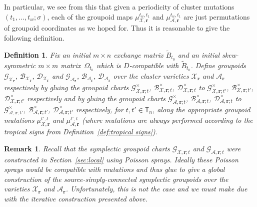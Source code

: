 \documentclass{amsart}
\newtheorem{definition}[theorem]{Definition}
\newtheorem{remark}[theorem]{Remark}
\numberwithin{equation}{section}
\newcommand{\bfr}{{\boldsymbol{r}}}
\newcommand{\cA}{\mathcal{A}}
\newcommand{\cB}{\mathcal{B}}
\newcommand{\cD}{\mathcal{D}}
\newcommand{\cG}{\mathcal{G}}
\newcommand{\cX}{\mathcal{X}}
\newcommand{\TT}{\mathbb{T}}
\begin{document}
In particular, we see from this that given a periodicity of cluster mutations $(t_1,\ldots,t_w;\sigma)$, each of the groupoid maps $\mu_{\cX,\bfr}^{t_w,t_1}$ and $\mu_{\cA,\bfr}^{t_w,t_1}$ are just permutations of groupoid coordinates as we hoped for.
Thus it is reasonable to give the following definition.
\begin{definition}
  Fix an initial $m\times n$ exchange matrix $\tilde B_{t_0}$ and an initial skew-symmetric $m\times m$ matrix~$\Omega_{t_0}$ which is $D$-compatible with $\tilde B_{t_0}$.
  Define groupoids $\cG_{\cX_\bfr}$, $\cB_{\cX_\bfr}$, $\cD_{\cX_\bfr}$ and $\cG_{\cA_\bfr}$, $\cB_{\cA_\bfr}$, $\cD_{\cA_\bfr}$ over the cluster varieties $\cX_\bfr$ and $\cA_\bfr$ respectively by gluing the groupoid charts $\cG^\times_{\cX,\bfr;t}$, $\cB^\times_{\cX,\bfr;t}$, $\cD^\times_{\cX,\bfr;t}$ to $\cG^\times_{\cX,\bfr;t'}$, $\cB^\times_{\cX,\bfr;t'}$, $\cD^\times_{\cX,\bfr;t'}$ respectively and by gluing the groupoid charts $\cG^\times_{\cA,\bfr;t}$, $\cB^\times_{\cA,\bfr;t}$, $\cD^\times_{\cA,\bfr;t}$ to $\cG^\times_{\cA,\bfr;t'}$, $\cB^\times_{\cA,\bfr;t'}$, $\cD^\times_{\cA,\bfr;t'}$ respectively, for $t,t'\in\TT_n$, along the appropriate groupoid mutations $\mu_{\cX,\bfr}^{t',t}$ and $\mu_{\cA,\bfr}^{t',t}$ (where mutations are always performed according to the tropical signs from Definition~\ref{def:tropical signs}).
\end{definition}
\begin{remark}
  Recall that the symplectic groupoid charts $\cG_{\cX,\bfr;t}$ and $\cG_{\cA,\bfr;t}$ were constructed in Section~\ref{sec:local} using Poisson sprays.
  Ideally these Poisson sprays would be compatible with mutations and thus glue to give a global construction of the source-simply-connected symplectic groupoids over the varieties $\cX_\bfr$ and $\cA_\bfr$.
  Unfortunately, this is not the case and we must make due with the iterative construction presented above.
\end{remark}
\end{document}
